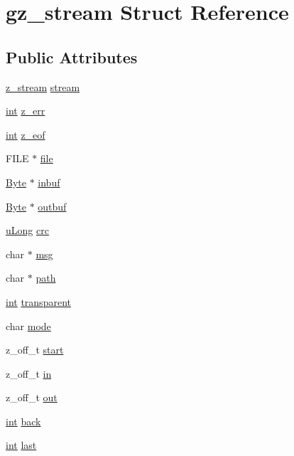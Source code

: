 \hypertarget{structgz__stream}{\section{gz\-\_\-stream Struct Reference}
\label{structgz__stream}
}
\subsection*{Public Attributes}
\begin{DoxyCompactItemize}
\item 
\hyperlink{zlib_8h_afa60092f4e0b9bc4f23b41c6930463f0}{z\-\_\-stream} \hyperlink{structgz__stream_a08366a18e41afcc67dd0965074286618}{stream}
\item 
\hyperlink{ioapi_8h_a787fa3cf048117ba7123753c1e74fcd6}{int} \hyperlink{structgz__stream_ace34952b7eac004c84d1d3726c5a3187}{z\-\_\-err}
\item 
\hyperlink{ioapi_8h_a787fa3cf048117ba7123753c1e74fcd6}{int} \hyperlink{structgz__stream_a1d0148ec4694b3ba81889cacb85b136a}{z\-\_\-eof}
\item 
F\-I\-L\-E $\ast$ \hyperlink{structgz__stream_a1b41d5983900b66bff148aa6361721db}{file}
\item 
\hyperlink{zconf_8h_ae3a497195d617519e5353ea7b417940f}{Byte} $\ast$ \hyperlink{structgz__stream_a332c5ae7b5ccd1a571d89ab15940ea70}{inbuf}
\item 
\hyperlink{zconf_8h_ae3a497195d617519e5353ea7b417940f}{Byte} $\ast$ \hyperlink{structgz__stream_acef09df121278a0b4053f45356bfa823}{outbuf}
\item 
\hyperlink{zconf_8h_a154b3b80120c903a368fec5f11f3007a}{u\-Long} \hyperlink{structgz__stream_a4d13a01877d20bda538cbf913029e49b}{crc}
\item 
char $\ast$ \hyperlink{structgz__stream_afe7afcaffe9005256f416273c8049ae5}{msg}
\item 
char $\ast$ \hyperlink{structgz__stream_a75008e50b323bcb85198023003cdc2c6}{path}
\item 
\hyperlink{ioapi_8h_a787fa3cf048117ba7123753c1e74fcd6}{int} \hyperlink{structgz__stream_a5bbfa8460d94ffea4ac6d78aedfc70d1}{transparent}
\item 
char \hyperlink{structgz__stream_a1a78082ea3705a5ea837dbfb9c19268f}{mode}
\item 
z\-\_\-off\-\_\-t \hyperlink{structgz__stream_ae136c7871c6a87f0190c8245921e8145}{start}
\item 
z\-\_\-off\-\_\-t \hyperlink{structgz__stream_a4dd2a80eecd5d13f03bb3feddcb12dc1}{in}
\item 
z\-\_\-off\-\_\-t \hyperlink{structgz__stream_a2a414dd95210bef0643cfe60678f72c0}{out}
\item 
\hyperlink{ioapi_8h_a787fa3cf048117ba7123753c1e74fcd6}{int} \hyperlink{structgz__stream_a3760ed2b7d4f83931000728a70846766}{back}
\item 
\hyperlink{ioapi_8h_a787fa3cf048117ba7123753c1e74fcd6}{int} \hyperlink{structgz__stream_a7c5213935b324dfb9a4101a73dd24a37}{last}
\end{DoxyCompactItemize}


